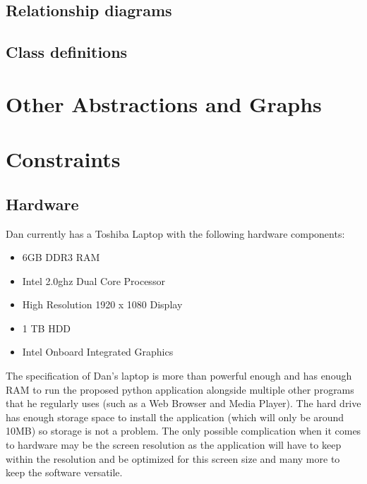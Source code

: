 \subsection{Relationship diagrams}



\subsection{Class definitions}



\section{Other Abstractions and Graphs}

\section{Constraints}

\subsection{Hardware}

\begin{flushleft}
	Dan currently has a Toshiba Laptop with the following hardware components:
	
	\begin{itemize}
		\item 6GB DDR3 RAM
		\item Intel 2.0ghz Dual Core Processor
		\item High Resolution 1920 x 1080 Display
		\item 1 TB HDD
		\item Intel Onboard Integrated Graphics
	\end{itemize}

	The specification of Dan's laptop is more than powerful enough and has enough RAM to run the proposed python application alongside multiple other programs that he regularly uses (such as a Web Browser and Media Player). The hard drive has enough storage space to install the application (which will only be around 10MB) so storage is not a problem. The only possible complication when it comes to hardware may be the screen resolution as the application will have to keep within the resolution and be optimized for this screen size and many more to keep the software versatile.
\end{flushleft}

